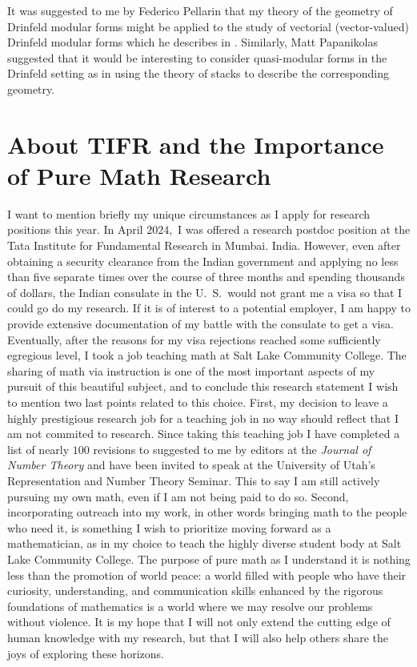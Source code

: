 \documentclass[12pt]{amsart}
\begin{document}
	It was suggested to me by Federico Pellarin that my theory of the geometry of Drinfeld modular forms might be applied to the study of vectorial (vector-valued) Drinfeld modular forms which he describes in \cite{Pellarin-vectorial-Drinfeld-mod-forms}. Similarly, Matt Papanikolas suggested that it would be interesting to consider quasi-modular forms in the Drinfeld setting as in \cite{Chen-Gezmiş-nearly-holomorphic-Drinfeld-modular-forms} using the theory of stacks to describe the corresponding geometry.
	
	\section{About TIFR and the Importance of Pure Math Research}
	
	I want to mention briefly my unique circumstances as I apply for research positions this year. In April $2024,$ I was offered a research postdoc position at the Tata Institute for Fundamental Research in Mumbai. India. However, even after obtaining a security clearance from the Indian government and applying no less than five separate times over the course of three months and spending thousands of dollars, the Indian consulate in the U.\ S.\ would not grant me a visa so that I could go do my research. If it is of interest to a potential employer, I am happy to provide extensive documentation of my battle with the consulate to get a visa.\\
	
	Eventually, after the reasons for my visa rejections reached some sufficiently egregious level, I took a job teaching math at Salt Lake Community College. The sharing of math via instruction is one of the most important aspects of my pursuit of this beautiful subject, and to conclude this research statement I wish to mention two last points related to this choice. First, my decision to leave a highly prestigious research job for a teaching job in no way should reflect that I am not commited to research. Since taking this teaching job I have completed a list of nearly $100$ revisions to \cite{Franklin-geometry-Drinfeld-modular-forms} suggested to me by editors at the \textit{Journal of Number Theory} and have been invited to speak at the University of Utah's Representation and Number Theory Seminar. This to say I am still actively pursuing my own math, even if I am not being paid to do so. Second, incorporating outreach into my work, in other words bringing math to the people who need it, is something I wish to prioritize moving forward as a mathematician, as in my choice to teach the highly diverse student body at Salt Lake Community College. The purpose of pure math as I understand it is nothing less than the promotion of world peace: a world filled with people who have their curiosity, understanding, and communication skills enhanced by the rigorous foundations of mathematics is a world where we may resolve our problems without violence. It is my hope that I will not only extend the cutting edge of human knowledge with my research, but that I will also help others share the joys of exploring these horizons. 

	
	
\newpage
 								
 						
\end{document}
